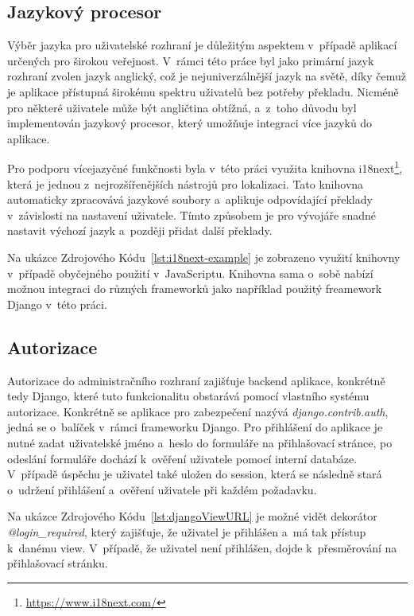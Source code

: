 \subsection{Jazykový procesor}
\label{subsec:implementation-technologies-compiler}
Výběr jazyka pro uživatelské rozhraní je důležitým aspektem v~případě aplikací určených pro širokou veřejnost. V~rámci této práce byl jako primární jazyk rozhraní zvolen jazyk anglický, což je nejuniverzálnější jazyk na světě, díky čemuž je aplikace přístupná širokému spektru uživatelů bez potřeby překladu. Nicméně pro některé uživatele může být angličtina obtížná, a~z~toho důvodu byl implementován jazykový procesor, který umožňuje integraci více jazyků do aplikace.

Pro podporu vícejazyčné funkčnosti byla v~této práci využita knihovna i18next\footnote{\href{https://www.i18next.com/}{https://www.i18next.com/}}, která je jednou z~nejrozšířenějších nástrojů pro lokalizaci. Tato knihovna automaticky zpracovává jazykové soubory a~aplikuje odpovídající překlady v~závislosti na nastavení uživatele. Tímto způsobem je pro vývojáře snadné nastavit výchozí jazyk a~později přidat další překlady.



Na ukázce Zdrojového Kódu~\ref{lst:i18next-example} je zobrazeno využití knihovny v~případě obyčejného použití v~JavaScriptu. Knihovna sama o~sobě nabízí možnou integraci do různých frameworků jako například použitý freamework Django v~této práci.

\subsection{Autorizace}
\label{subsec:implementation-technologies-authorization}
Autorizace do administračního rozhraní zajišťuje backend aplikace, konkrétně tedy Django, které tuto funkcionalitu obstarává pomocí vlastního systému autorizace. Konkrétně se aplikace pro zabezpečení nazývá \textit{django.contrib.auth}, jedná se o~balíček v~rámci frameworku Django. Pro přihlášení do aplikace je nutné zadat uživatelské jméno a~heslo do formuláře na přihlašovací stránce, po odeslání formuláře dochází k~ověření uživatele pomocí interní databáze. V~případě úspěchu je uživatel také uložen do session, která se následně stará o~udržení přihlášení a~ověření uživatele při každém požadavku.

Na ukázce Zdrojového Kódu~\ref{lst:djangoViewURL} je možné vidět dekorátor \textit{@login\_required}, který zajišťuje, že uživatel je přihlášen a~má tak přístup k~danému view. V~případě, že uživatel není přihlášen, dojde k~přesměrování na přihlašovací stránku.

